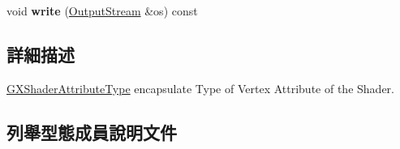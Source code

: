\begin{DoxyCompactItemize}
\item 
void {\bfseries write} (\hyperlink{class_i_dream_sky_1_1_output_stream}{Output\+Stream} \&os) const \hypertarget{class_i_dream_sky_1_1_g_x_shader_attribute_type_aa12442873c04f7de519da7c1e9a64fe1}{}\label{class_i_dream_sky_1_1_g_x_shader_attribute_type_aa12442873c04f7de519da7c1e9a64fe1}

\end{DoxyCompactItemize}


\subsection{詳細描述}
\hyperlink{class_i_dream_sky_1_1_g_x_shader_attribute_type}{G\+X\+Shader\+Attribute\+Type} encapsulate Type of Vertex Attribute of the Shader. 

\subsection{列舉型態成員說明文件}
